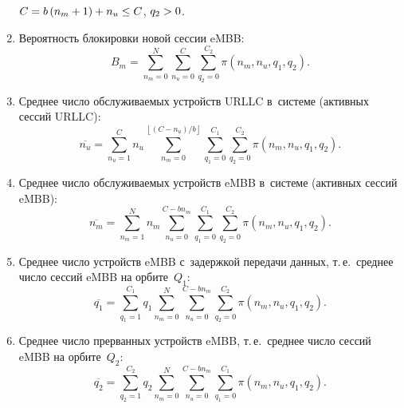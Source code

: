 \begin{multicols}{2}
\begin{enumerate}[1.]
    $C\hm=b\left( n_{m}\hm+1 \right)\hm+n_{u} \hm\le C$, $q_2\hm>0$.
    \item Вероятность блокировки новой сессии \mbox{eMBB}:
    \begin{equation*}
    B_{m}=
    \sum\limits_{n_{m}=0}^{N}
    {\sum\limits_{n_{u}=0}^{C}
    {\sum\limits_{q_2=0}^{C_2}
    {\pi\left(n_{m},n_{u},q_1,q_2 \right).}}}
    \end{equation*}
    \item Среднее число обслуживаемых устройств URLLC в~системе (активных сессий URLLC):
    \begin{equation*}
        \overline{n_{u}}=
        \sum\limits_{n_{u}=1}^{C}n_{u}\!
        {\sum\limits_{n_{m}=0}^
        {\left\lfloor ({C-n_{u}})/{b} \right\rfloor}
\!        {\sum\limits_{q_1=0}^{C_1}
        {\sum\limits_{q_2=0}^{C_2}
        {\pi \left(n_{m},n_{u},q_1,q_2 \right)}}}}.
    \end{equation*}
    \item Среднее число обслуживаемых устройств \mbox{eMBB} в~системе (активных сессий \mbox{eMBB}):
    \begin{equation*}
    \overline{n_{m}}=
        \sum\limits_{n_{m}=1}^{N}n_{m}
        {\sum\limits_{n_{u}=0}^{C-bn_{m}}
        {\sum\limits_{q_1=0}^{C_1}
        {\sum\limits_{q_2=0}^{C_2}
        {\pi \left(n_{m},n_{u},q_1,q_2 \right)}}}}.
    \end{equation*}
    \item Среднее число устройств \mbox{eMBB} с~задержкой передачи данных, т.\,е.\ 
    среднее число сессий \mbox{eMBB} на орбите~$Q_1$:
    \begin{equation*}
        \overline{q_1}=
        \sum\limits_{q_1=1}^{C_1}
        q_1
        {\sum\limits_{n_{m}=0}^{N}
        {\sum\limits_{n_{u}=0}^{C-bn_{m}}
        {\sum\limits_{q_2=0}^{C_2}
        {\pi\left(n_{m},n_{u},q_1,q_2 \right)}}}}.
    \end{equation*}
    \item Среднее число прерванных устройств \mbox{eMBB}, т.\,е.\ среднее число сессий \mbox{eMBB} на орбите~$Q_2$:
    \begin{equation*}
         \overline{q_2}=
        \sum\limits_{q_2=1}^{C_2}
        q_2
        {\sum\limits_{n_{m}=0}^{N}
        {\sum\limits_{n_{u}=0}^{C-bn_{m}}
        {\sum\limits_{q_1=0}^{C_1}
        {\pi\left(n_{m},n_{u},q_1,q_2 \right)}}}}.
    \end{equation*}
\end{enumerate}

\vspace*{-9pt}



\end{multicols}
